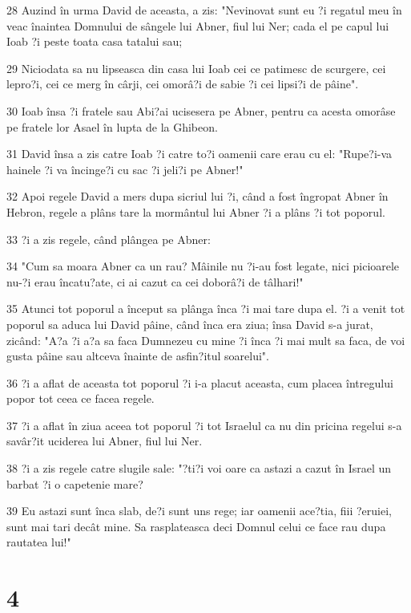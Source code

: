 \par 28 Auzind în urma David de aceasta, a zis: "Nevinovat sunt eu ?i regatul meu în veac înaintea Domnului de sângele lui Abner, fiul lui Ner; cada el pe capul lui Ioab ?i peste toata casa tatalui sau;
\par 29 Niciodata sa nu lipseasca din casa lui Ioab cei ce patimesc de scurgere, cei lepro?i, cei ce merg în cârji, cei omorâ?i de sabie ?i cei lipsi?i de pâine".
\par 30 Ioab însa ?i fratele sau Abi?ai ucisesera pe Abner, pentru ca acesta omorâse pe fratele lor Asael în lupta de la Ghibeon.
\par 31 David însa a zis catre Ioab ?i catre to?i oamenii care erau cu el: "Rupe?i-va hainele ?i va încinge?i cu sac ?i jeli?i pe Abner!"
\par 32 Apoi regele David a mers dupa sicriul lui ?i, când a fost îngropat Abner în Hebron, regele a plâns tare la mormântul lui Abner ?i a plâns ?i tot poporul.
\par 33 ?i a zis regele, când plângea pe Abner:
\par 34 "Cum sa moara Abner ca un rau? Mâinile nu ?i-au fost legate, nici picioarele nu-?i erau încatu?ate, ci ai cazut ca cei doborâ?i de tâlhari!"
\par 35 Atunci tot poporul a început sa plânga înca ?i mai tare dupa el. ?i a venit tot poporul sa aduca lui David pâine, când înca era ziua; însa David s-a jurat, zicând: "A?a ?i a?a sa faca Dumnezeu cu mine ?i înca ?i mai mult sa faca, de voi gusta pâine sau altceva înainte de asfin?itul soarelui".
\par 36 ?i a aflat de aceasta tot poporul ?i i-a placut aceasta, cum placea întregului popor tot ceea ce facea regele.
\par 37 ?i a aflat în ziua aceea tot poporul ?i tot Israelul ca nu din pricina regelui s-a savâr?it uciderea lui Abner, fiul lui Ner.
\par 38 ?i a zis regele catre slugile sale: "?ti?i voi oare ca astazi a cazut în Israel un barbat ?i o capetenie mare?
\par 39 Eu astazi sunt înca slab, de?i sunt uns rege; iar oamenii ace?tia, fiii ?eruiei, sunt mai tari decât mine. Sa rasplateasca deci Domnul celui ce face rau dupa rautatea lui!"

\chapter{4}

